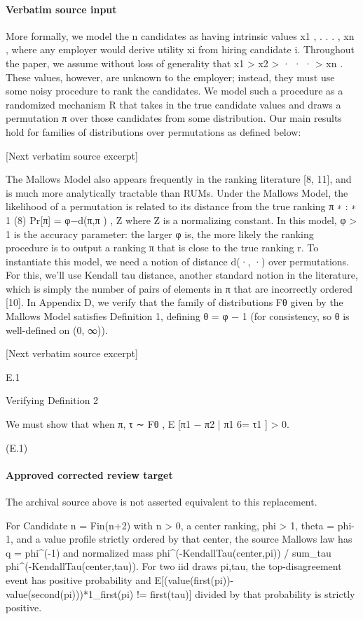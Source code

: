 \documentclass[10pt]{article}
\begin{document}
\paragraph{Verbatim source input}
\begin{ReviewVerbatim}
More formally, we model the n candidates as having intrinsic values x1 , . . . , xn , where any employer would
derive utility xi from hiring candidate i. Throughout the paper, we assume without loss of generality that
x1 > x2 > · · · > xn . These values, however, are unknown to the employer; instead, they must use some
noisy procedure to rank the candidates. We model such a procedure as a randomized mechanism R that
takes in the true candidate values and draws a permutation π over those candidates from some distribution.
Our main results hold for families of distributions over permutations as defined below:

[Next verbatim source excerpt]

The Mallows Model also appears frequently in the ranking literature [8, 11], and is much more analytically
tractable than RUMs. Under the Mallows Model, the likelihood of a permutation is related to its distance
from the true ranking π ∗ :
∗
1
(8)
Pr[π] = φ−d(π,π ) ,
Z
where Z is a normalizing constant. In this model, φ > 1 is the accuracy parameter: the larger φ is, the
more likely the ranking procedure is to output a ranking π that is close to the true ranking r. To instantiate
this model, we need a notion of distance d(·, ·) over permutations. For this, we’ll use Kendall tau distance,
another standard notion in the literature, which is simply the number of pairs of elements in π that are
incorrectly ordered [10]. In Appendix D, we verify that the family of distributions Fθ given by the Mallows
Model satisfies Definition 1, defining θ = φ − 1 (for consistency, so θ is well-defined on (0, ∞)).

[Next verbatim source excerpt]

E.1

Verifying Definition 2

We must show that when π, τ ∼ Fθ ,
E [π1 − π2 | π1 6= τ1 ] > 0.

(E.1)
\end{ReviewVerbatim}

\paragraph{Approved corrected review target}
The archival source above is not asserted equivalent to this replacement.
\begin{ReviewVerbatim}
For Candidate n = Fin(n+2) with n > 0, a center ranking, phi > 1, theta = phi-1, and a value profile strictly ordered by that center, the source Mallows law has q = phi^(-1) and normalized mass phi^(-KendallTau(center,pi)) / sum_tau phi^(-KendallTau(center,tau)). For two iid draws pi,tau, the top-disagreement event has positive probability and E[(value(first(pi))-value(second(pi)))*1_{first(pi) != first(tau)}] divided by that probability is strictly positive.
\end{ReviewVerbatim}
\end{document}
